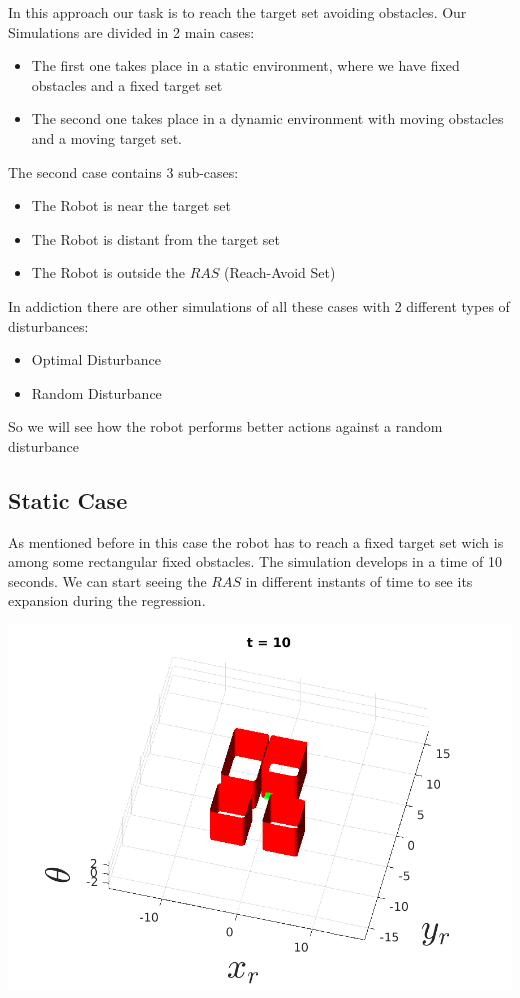 In this approach our task is to reach the target set avoiding obstacles. Our Simulations are divided in 2 main cases: 
\begin{itemize}
    \item The first one takes place in a static environment, where we have fixed obstacles and a fixed target set 
    \item The second one takes place in a dynamic environment with moving obstacles and a moving target set.
\end{itemize}
The second case contains 3 sub-cases:  
\begin{itemize}
    \item The Robot is near the target set
    \item The Robot is distant from the target set
    \item The Robot is outside the $RAS$ (Reach-Avoid Set)
\end{itemize}
In addiction there are other simulations of all these cases with 2 different types of disturbances: 
\begin{itemize}
    \item Optimal Disturbance
    \item Random Disturbance
\end{itemize}
So we will see how the robot performs better actions against a random disturbance
\subsection{Static Case}
    As mentioned before in this case the robot has to reach a fixed target set wich is among some rectangular fixed obstacles. The simulation develops in a time of 10 seconds.
    We can start seeing the $RAS$ in different instants of time to see its expansion during the regression.
    
    \includegraphics[scale=0.6]{figures/staticRAS1.png}
    
